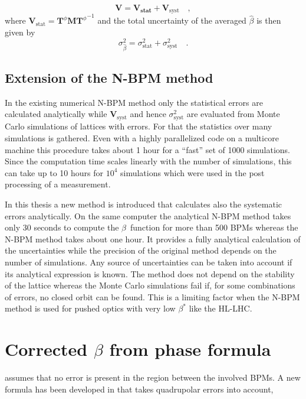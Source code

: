 \begin{equation}
\mathbf{V} = \mathbf{V_\text{stat}} + \mathbf{V}_\text{syst}\quad ,
\label{eq:V1}
\end{equation}
where $ \mathbf{V}_\text{stat} = \mathbf{T}^\phi \mathbf{M} {\mathbf{T}^{\phi}}^{-1}$ and the total uncertainty of the averaged $ \hat{\beta} $ is then given by
\begin{equation}
\sigma_{\hat{\beta}}^2 = \sigma_\text{stat}^2 + \sigma_\text{syst}^2\quad .
\end{equation}

\subsection{Extension of the N-BPM method}

In the existing numerical N-BPM method only the statistical errors are calculated analytically while
$\mathbf{V}_\text{syst}$ and hence $\sigma_\text{syst}^2$ are evaluated from Monte Carlo simulations
of lattices with errors.
For that the statistics over many simulations is gathered.
Even with a highly parallelized code on a multicore machine this procedure takes about 1 hour for a
``fast'' set of 1000 simulations. Since the computation time scales linearly with the number of simulations,
this can take up to 10 hours for $10^{4}$ simulations which were used in the post processing of a measurement.

In this thesis a new method is introduced that calculates also the systematic errors analytically. 
On the same computer the analytical N-BPM method takes only 30 seconds to compute the $ \beta $~function
for more than 500 BPMs whereas the N-BPM method takes about one hour.
It provides a fully analytical calculation of the uncertainties while the precision of the original
method depends on the number of simulations. Any source of uncertainties can be taken into account
if its analytical expression is known. The method does not depend on the stability of the lattice whereas
the Monte Carlo simulations fail if, for some combinations of errors, no closed orbit can be found.
This is a limiting factor when the N-BPM method is used for pushed optics with very low $ \beta^* $ like the HL-LHC. 


\section{Corrected $\beta$ from phase formula}
 assumes that no error is present in the region between the involved BPMs.
A new formula has been developed in \cite{Franchi2016} that takes quadrupolar errors into account,

